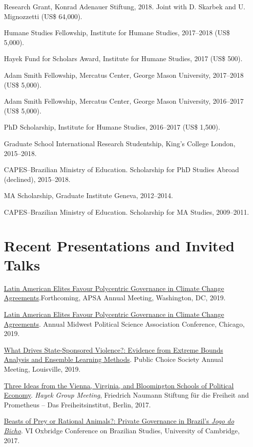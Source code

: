 \documentclass[a4paper]{article}
\renewenvironment{itemize}{
  \begin{list}{}{
    \setlength{\leftmargin}{1.5em}
  }
}{
  \end{list}
}
\begin{document}
\begin{itemize}
    \item Research Grant, Konrad Adenauer Stiftung, 2018. Joint with D. Skarbek and U. Mignozzetti (US\$ 64,000).
	\item Humane Studies Fellowship, Institute for Humane Studies, 2017--2018 (US\$ 5,000).
	\item Hayek Fund for Scholars Award, Institute for Humane Studies, 2017 (US\$ 500).
	\item Adam Smith Fellowship, Mercatus Center, George Mason University, 2017--2018 (US\$ 5,000).
	\item Adam Smith Fellowship, Mercatus Center, George Mason University, 2016--2017 (US\$ 5,000).
	\item PhD Scholarship, Institute for Humane Studies, 2016--2017 (US\$ 1,500).
	\item Graduate School International Research Studentship, King's College London, 2015--2018.
	\item CAPES--Brazilian Ministry of Education. Scholarship for PhD Studies Abroad (declined), 2015--2018.
	\item MA Scholarship, Graduate Institute Geneva, 2012--2014.
	\item CAPES--Brazilian Ministry of Education. Scholarship for MA Studies, 2009--2011.
\end{itemize}

\section*{Recent Presentations and Invited Talks}

\begin{itemize}
    \item \href{https://osf.io/9a6ch}{Latin American Elites Favour Polycentric Governance in Climate Change Agreements}.Forthcoming, APSA Annual Meeting, Washington, DC, 2019.
    \item \href{https://osf.io/9a6ch}{Latin American Elites Favour Polycentric Governance in Climate Change Agreements}. Annual Midwest Political Science Association Conference, Chicago, 2019.
    \item \href{http://danilofreire.github.io/pcs-2019}{What Drives State-Sponsored Violence?: Evidence from Extreme Bounds Analysis and Ensemble Learning Methods}. Public Choice Society Annual Meeting, Louisville, 2019.
    \item \href{https://www.overleaf.com/project/591ef5259fb58ede3dc4d369}{Three Ideas from the Vienna, Virginia, and Bloomington Schools of Political Economy}. \textit{Hayek Group Meeting}, Friedrich Naumann Stiftung f{\"u}r die Freiheit and Prometheus -- Das Freiheitsinstitut, Berlin, 2017.
	\item \href{https://osf.io/se2jr}{Beasts of Prey or Rational Animals?: Private Governance in Brazil's \emph{Jogo do Bicho}}. VI Oxbridge Conference on Brazilian Studies, University of Cambridge, 2017.
\end{itemize}
\end{document}
